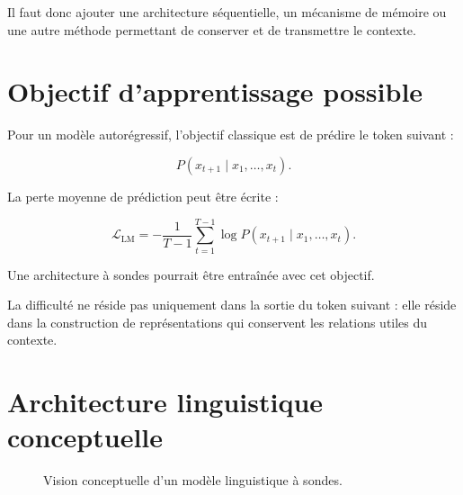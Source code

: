 \documentclass[11pt,a4paper]{report}
\begin{document}
Il faut donc ajouter une architecture séquentielle,
un mécanisme de mémoire ou une autre méthode permettant
de conserver et de transmettre le contexte.

\section{Objectif d'apprentissage possible}

Pour un modèle autorégressif, l'objectif classique
est de prédire le token suivant :

\[
P(x_{t+1}\mid x_1,\ldots,x_t).
\]

La perte moyenne de prédiction peut être écrite :

\[
\mathcal{L}_{\mathrm{LM}}
=
-\frac{1}{T-1}
\sum_{t=1}^{T-1}
\log P(x_{t+1}\mid x_1,\ldots,x_t).
\]

Une architecture à sondes pourrait être entraînée avec
cet objectif.

La difficulté ne réside pas uniquement dans la sortie
du token suivant : elle réside dans la construction
de représentations qui conservent les relations utiles
du contexte.

\section{Architecture linguistique conceptuelle}

\begin{figure}[H]
\centering
{}
\caption{Vision conceptuelle d'un modèle linguistique à sondes.}
\end{figure}
\end{document}
